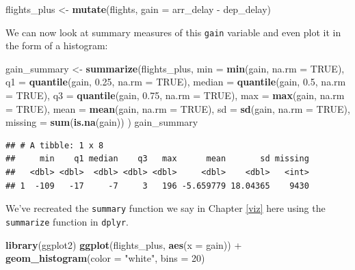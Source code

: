 \documentclass[]{tufte-book}
\newenvironment{Shaded}{\begin{snugshade}}{\end{snugshade}}
\newcommand{\KeywordTok}[1]{\textcolor[rgb]{0.13,0.29,0.53}{\textbf{{#1}}}}
\newcommand{\DataTypeTok}[1]{\textcolor[rgb]{0.13,0.29,0.53}{{#1}}}
\newcommand{\DecValTok}[1]{\textcolor[rgb]{0.00,0.00,0.81}{{#1}}}
\newcommand{\FloatTok}[1]{\textcolor[rgb]{0.00,0.00,0.81}{{#1}}}
\newcommand{\StringTok}[1]{\textcolor[rgb]{0.31,0.60,0.02}{{#1}}}
\newcommand{\OtherTok}[1]{\textcolor[rgb]{0.56,0.35,0.01}{{#1}}}
\newcommand{\NormalTok}[1]{{#1}}
\begin{document}
\begin{Shaded}
\begin{Highlighting}[]
\NormalTok{flights_plus <-}\StringTok{ }\KeywordTok{mutate}\NormalTok{(flights,}
         \DataTypeTok{gain =} \NormalTok{arr_delay -}\StringTok{ }\NormalTok{dep_delay)}
\end{Highlighting}
\end{Shaded}

We can now look at summary measures of this \texttt{gain} variable and
even plot it in the form of a histogram:

\begin{Shaded}
\begin{Highlighting}[]
\NormalTok{gain_summary <-}\StringTok{ }\KeywordTok{summarize}\NormalTok{(flights_plus,}
          \DataTypeTok{min =} \KeywordTok{min}\NormalTok{(gain, }\DataTypeTok{na.rm =} \OtherTok{TRUE}\NormalTok{),}
          \DataTypeTok{q1 =} \KeywordTok{quantile}\NormalTok{(gain, }\FloatTok{0.25}\NormalTok{, }\DataTypeTok{na.rm =} \OtherTok{TRUE}\NormalTok{),}
          \DataTypeTok{median =} \KeywordTok{quantile}\NormalTok{(gain, }\FloatTok{0.5}\NormalTok{, }\DataTypeTok{na.rm =} \OtherTok{TRUE}\NormalTok{),}
          \DataTypeTok{q3 =} \KeywordTok{quantile}\NormalTok{(gain, }\FloatTok{0.75}\NormalTok{, }\DataTypeTok{na.rm =} \OtherTok{TRUE}\NormalTok{),}
          \DataTypeTok{max =} \KeywordTok{max}\NormalTok{(gain, }\DataTypeTok{na.rm =} \OtherTok{TRUE}\NormalTok{),}
          \DataTypeTok{mean =} \KeywordTok{mean}\NormalTok{(gain, }\DataTypeTok{na.rm =} \OtherTok{TRUE}\NormalTok{),}
          \DataTypeTok{sd =} \KeywordTok{sd}\NormalTok{(gain, }\DataTypeTok{na.rm =} \OtherTok{TRUE}\NormalTok{),}
          \DataTypeTok{missing =} \KeywordTok{sum}\NormalTok{(}\KeywordTok{is.na}\NormalTok{(gain))}
\NormalTok{)}
\NormalTok{gain_summary}
\end{Highlighting}
\end{Shaded}

\begin{verbatim}
## # A tibble: 1 x 8
##     min    q1 median    q3   max      mean       sd missing
##   <dbl> <dbl>  <dbl> <dbl> <dbl>     <dbl>    <dbl>   <int>
## 1  -109   -17     -7     3   196 -5.659779 18.04365    9430
\end{verbatim}

We've recreated the \texttt{summary} function we say in Chapter
\ref{viz} here using the \texttt{summarize} function in \texttt{dplyr}.

\begin{Shaded}
\begin{Highlighting}[]
\KeywordTok{library}\NormalTok{(ggplot2)}
\KeywordTok{ggplot}\NormalTok{(flights_plus, }\KeywordTok{aes}\NormalTok{(}\DataTypeTok{x =} \NormalTok{gain)) +}
\StringTok{  }\KeywordTok{geom_histogram}\NormalTok{(}\DataTypeTok{color =} \StringTok{"white"}\NormalTok{, }\DataTypeTok{bins =} \DecValTok{20}\NormalTok{)}
\end{Highlighting}
\end{Shaded}
\end{document}
